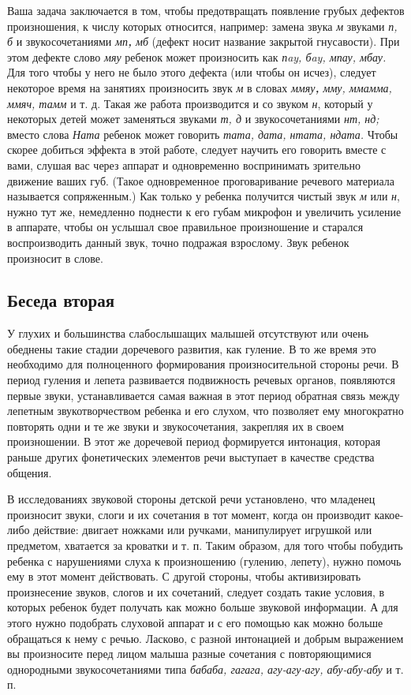 \documentclass[a5paper]{book}
\renewcommand{\emph}[1]{\textit{#1}}
\begin{document}
Ваша задача заключается в том, чтобы предотвращать появление грубых
дефектов произношения, к числу которых относится, например: замена звука
\emph{м} звуками \emph{п, б} и звукосочетаниями \emph{мп\textbf{,} мб}
(дефект носит название закрытой гнусавости). При этом дефекте слово
\emph{мяу} ребенок может произносить как \emph{пay, бay, мпау, мбау.}
Для того чтобы у него не было этого дефекта (или чтобы он исчез),
следует некоторое время на занятиях произносить звук \emph{м} в словах
\emph{ммяу\textbf{,} мму, ммамма, ммяч, тамм} и т. д. Такая же работа
производится и со звуком \emph{н}, который у некоторых детей может
заменяться звуками \emph{т, д} и звукосочетаниями \emph{нт, нд;} вместо
слова \emph{Ната} ребенок может говорить \emph{тата, дата, нтата,
ндата.} Чтобы скорее добиться эффекта в этой работе, следует научить его
говорить вместе с вами, слушая вас через аппарат и одновременно
воспринимать зрительно движение ваших губ. (Такое одновременное
проговаривание речевого материала называется сопряженным.) Как только у
ребенка получится чистый звук \emph{м} или \emph{н}, нужно тут же,
немедленно поднести к его губам микрофон и увеличить усиление в
аппарате, чтобы он услышал свое правильное произношение и старался
воспроизводить данный звук, точно подражая взрослому. Звук ребенок
произносит в слове.

\subsection*{Беседа вторая}

У глухих и большинства слабослышащих малышей отсутствуют или очень
обеднены такие стадии доречевого развития, как гуление. В то же время
это необходимо для полноценного формирования произносительной стороны
речи. В период гуления и лепета развивается подвижность речевых органов,
появляются первые звуки, устанавливается самая важная в этот период
обратная связь между лепетным звукотворчеством ребенка и его слухом, что
позволяет ему многократно повторять одни и те же звуки и звукосочетания,
закрепляя их в своем произношении. В этот же доречевой период
формируется интонация, которая раньше других фонетических элементов речи
выступает в качестве средства общения.

В исследованиях звуковой стороны детской речи установлено, что младенец
произносит звуки, слоги и их сочетания в тот момент, когда он производит
какое-либо действие: двигает ножками или ручками, манипулирует игрушкой
или предметом, хватается за кроватки и т. п. Таким образом, для того
чтобы побудить ребенка с нарушениями слуха к произношению (гулению,
лепету), нужно помочь ему в этот момент действовать. С другой стороны,
чтобы активизировать произнесение звуков, слогов и их сочетаний, следует
создать такие условия, в которых ребенок будет получать как можно больше
звуковой информации. А для этого нужно подобрать слуховой аппарат и с
его помощью как можно больше обращаться к нему с речью. Ласково, с
разной интонацией и добрым выражением вы произносите перед лицом малыша
разные сочетания с повторяющимися однородными звукосочетаниями типа
\emph{бабаба, гагага, агу-агу-агу, абу-абу-абу} и т. п.
\end{document}
